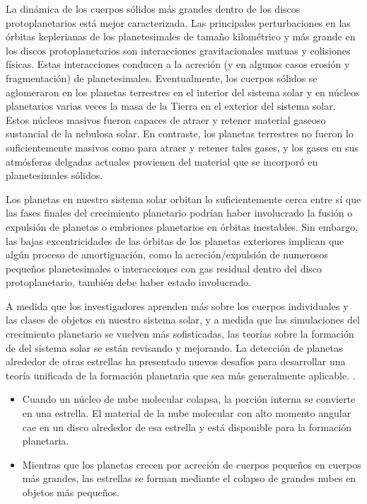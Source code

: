 \documentclass[12pt]{article}
\begin{document}
La dinámica de los cuerpos sólidos más grandes dentro de los discos protoplanetarios está mejor caracterizada. 
Las principales perturbaciones en las órbitas keplerianas de los planetesimales de tamaño kilométrico y más 
grande en los discos protoplanetarios son interacciones gravitacionales mutuas y colisiones físicas. Estas
interacciones conducen a la acreción (y en algunos casos erosión y fragmentación) de planetesimales. Eventualmente, 
los cuerpos sólidos se aglomeraron en los planetas terrestres en el interior del sistema solar y en núcleos 
planetarios varias veces la masa de la Tierra en el exterior del sistema solar. Estos núcleos masivos fueron capaces
de atraer y retener material gaseoso sustancial de la nebulosa solar. En contraste, los planetas terrestres no 
fueron lo suficientemente masivos como para atraer y retener tales gases, y los gases en sus
atmósferas delgadas actuales provienen del material que se incorporó en planetesimales sólidos.

Los planetas en nuestro sistema solar orbitan lo suficientemente cerca entre sí que las fases finales del 
crecimiento planetario podrían haber involucrado la fusión o expulsión de planetas o
embriones planetarios en órbitas inestables. Sin embargo, las bajas excentricidades de las órbitas de los 
planetas exteriores implican que algún proceso de amortiguación, como la acreción/expulsión de
numerosos pequeños planetesimales o interacciones con gas residual dentro del disco protoplanetario, 
también debe haber estado involucrado.

A medida que los investigadores aprenden más sobre los cuerpos individuales y las clases de objetos en 
nuestro sistema solar, y a medida que las simulaciones del crecimiento planetario se vuelven
más sofisticadas, las teorías sobre la formación de del sistema solar se están revisando y 
mejorando. La detección de planetas alrededor de otras estrellas  ha presentado nuevos 
desafíos para desarrollar una teoría unificada de la formación planetaria que sea más generalmente aplicable.
\parencite{PLanet_formation}.
\begin{itemize}
    \item Cuando un núcleo de nube molecular colapsa, la porción
    interna se convierte en una estrella. El material de la nube
    molecular con alto momento angular cae en un disco alrededor de
    esa estrella y está disponible para la formación planetaria.
    \item Mientras que los planetas crecen por acreción de cuerpos
    pequeños en cuerpos más grandes, las estrellas se forman mediante
    el colapso de grandes nubes en objetos más pequeños.
\end{itemize}
\end{document}
